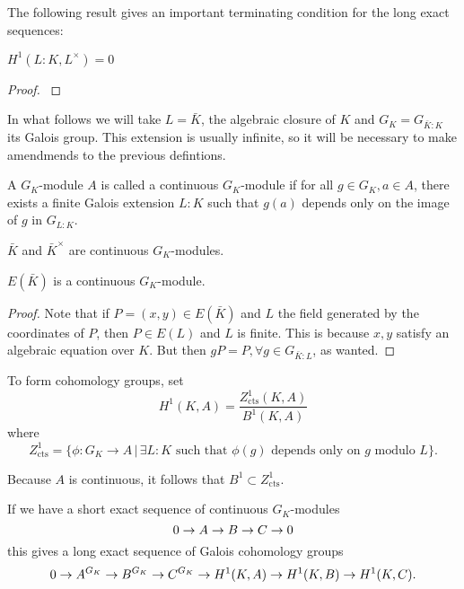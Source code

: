 \documentclass[12pt, a4paper]{amsart}
\begin{document}
The following result gives an important terminating condition for the
long exact sequences:

\begin{thm}
  $  H^1(L : K, L^{\times}) = 0$
\end{thm}
\begin{proof}
  \cite[See][Chapter X, page 150]{cohomology}
\end{proof}

In what follows we will take $L = \bar{K}$, the algebraic closure of $K$ and
$G_K = G_{\bar{K}:K}$ its Galois group. This extension is usually infinite, so
it will be necessary to make amendmends to the previous defintions.

\begin{defn}
  A $G_K$-module $A$ is called a continuous $G_K$-module if for all $g \in G_K, a \in A$,
  there exists a finite Galois extension $L:K$ such that $g(a)$
  depends only on the image of $g$ in $G_{L:K}$.
\end{defn}

\begin{example}
  $\bar{K}$ and $ \bar{K}^{\times}$ are continuous $G_K$-modules.
\end{example}

\begin{lemma}
  $E(\bar{K})$ is a continuous $G_K$-module.
\end{lemma}
\begin{proof}
  Note that if $P = (x,y) \in E(\bar{K})$ and $L$ the field generated
  by the coordinates of $P$, then $P \in E(L)$ and $L$ is finite. This is
  because $x, y$ satisfy an algebraic equation over $K$. But then
  $g P = P, \forall g \in G_{\bar{K} : L}$, as wanted.
\end{proof}
  
To form cohomology groups, set
\[H^1(K,A) = \frac{Z^1_{\text{cts}}(K,A)}{B^1(K,A)}\]
where
\[Z^1_{\text{cts}} = \{\phi : G_K \rightarrow A \, | \, \exists L : K
  \text{ such that } \phi(g) \text{ depends only on } g \text{ modulo } L\}.\]
\begin{remark}
  Because $A$ is continuous, it follows that $B^1 \subset Z^1_{\text{cts}}$.
\end{remark}

If we have a short exact sequence of continuous $G_K$-modules
\[ 0 \rightarrow A \rightarrow B \rightarrow C \rightarrow 0\]
this gives a long exact sequence of Galois cohomology groups
\[0 \rightarrow A^{G_K} \rightarrow B^{G_K} \rightarrow C^{G_K} \rightarrow H^1(K,A) \rightarrow H^1(K,B) \rightarrow H^1(K,C).\]
\end{document}
